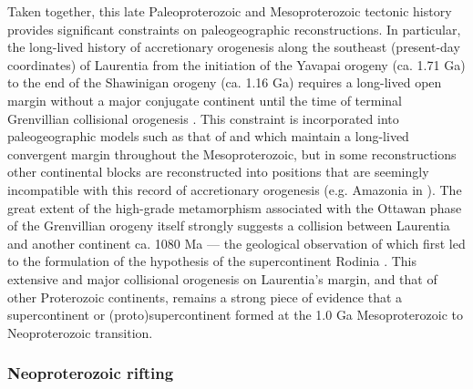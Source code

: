 \documentclass[twocolumn, switch]{article} %
\begin{document}
Taken together, this late Paleoproterozoic and Mesoproterozoic tectonic history provides significant constraints on paleogeographic reconstructions. In particular, the long-lived history of accretionary orogenesis along the southeast (present-day coordinates) of Laurentia from the initiation of the Yavapai orogeny (ca. 1.71 Ga) to the end of the Shawinigan orogeny (ca. 1.16 Ga) requires a long-lived open margin without a major conjugate continent until the time of terminal Grenvillian collisional orogenesis \citep{Karlstrom2001a}. This constraint is incorporated into paleogeographic models such as that of \citet{Zhang2012a} and \citet{Pehrsson2015a} which maintain a long-lived convergent margin throughout the Mesoproterozoic, but in some reconstructions other continental blocks are reconstructed into positions that are seemingly incompatible with this record of accretionary orogenesis (e.g. Amazonia in \citealp{Elming2009a, Elming2021a}). The great extent of the high-grade metamorphism associated with the Ottawan phase of the Grenvillian orogeny itself strongly suggests a collision between Laurentia and another continent ca. 1080 Ma --- the geological observation of which first led to the formulation of the hypothesis of the supercontinent Rodinia \citep{Hoffman1991a}. This extensive and major collisional orogenesis on Laurentia's margin, and that of other Proterozoic continents, remains a strong piece of evidence that a supercontinent or (proto)supercontinent formed at the 1.0 Ga Mesoproterozoic to Neoproterozoic transition.

\subsubsection{Neoproterozoic rifting}
\end{document}
